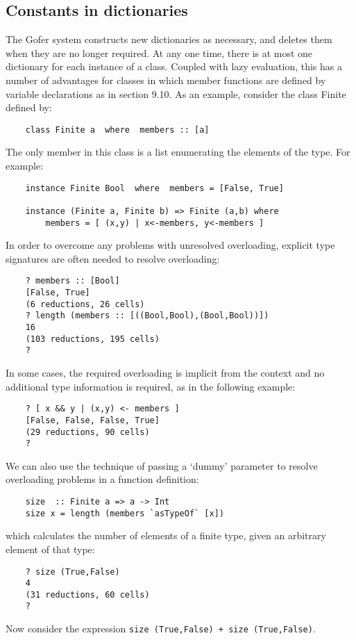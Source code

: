 \subsection{Constants in dictionaries}
The Gofer system constructs new dictionaries as necessary, and  deletes
them when they are no longer required.  At any one time,  there  is  at
most one dictionary for each instance of a class.   Coupled  with  lazy
evaluation, this has a number of advantages for classes in which member
functions are defined by variable declarations as in section 9.10.   As
an example, consider the class Finite defined by:
\begin{verbatim}
    class Finite a  where  members :: [a]
\end{verbatim}
The only member in this class is a list enumerating the elements of the
type.  For example:
\begin{verbatim}
    instance Finite Bool  where  members = [False, True]
 
    instance (Finite a, Finite b) => Finite (a,b) where
        members = [ (x,y) | x<-members, y<-members ]
\end{verbatim}
In order to overcome any problems with unresolved overloading, explicit
type signatures are often needed to resolve overloading:
\begin{verbatim}
    ? members :: [Bool]
    [False, True]
    (6 reductions, 26 cells)
    ? length (members :: [((Bool,Bool),(Bool,Bool))])
    16
    (103 reductions, 195 cells)
    ?
\end{verbatim}
In some cases, the required overloading is implicit  from  the  context
and no additional type information is required,  as  in  the  following
example:
\begin{verbatim}
    ? [ x && y | (x,y) <- members ]
    [False, False, False, True]
    (29 reductions, 90 cells)
    ?
\end{verbatim}
We can also use the technique of passing a `dummy' parameter to resolve
overloading problems in a function definition:
\begin{verbatim}
    size  :: Finite a => a -> Int
    size x = length (members `asTypeOf` [x])
\end{verbatim}
which calculates the number of elements of  a  finite  type,  given  an
arbitrary element of that type:
\begin{verbatim}
    ? size (True,False)
    4
    (31 reductions, 60 cells)
    ?
\end{verbatim}
Now consider the expression \verb"size (True,False) + size (True,False)".
